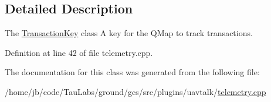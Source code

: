\subsection{\-Detailed \-Description}
\-The \hyperlink{class_transaction_key}{\-Transaction\-Key} class \-A key for the \-Q\-Map to track transactions. 

\-Definition at line 42 of file telemetry.\-cpp.



\-The documentation for this class was generated from the following file\-:\begin{DoxyCompactItemize}
\item 
/home/jb/code/\-Tau\-Labs/ground/gcs/src/plugins/uavtalk/\hyperlink{telemetry_8cpp}{telemetry.\-cpp}\end{DoxyCompactItemize}
